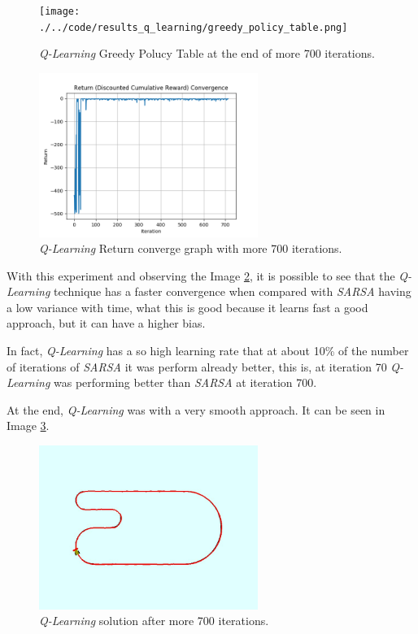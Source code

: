 \documentclass[journal]{IEEEtran}
\begin{document}
\begin{figure}
  \begin{center}
  \texttt{[image: ./../code/results\_q\_learning/greedy\_policy\_table.png]}
  \caption{\textit{Q-Learning} Greedy Polucy Table at the end of more 700 iterations.}
  \label{img:qlearning_greedy}
  \end{center}
\end{figure}

\begin{figure}
  \begin{center}
  \includegraphics[width=2.8in]{./../code/results_q_learning/return_convergence.png}
  \caption{\textit{Q-Learning} Return converge graph with more 700 iterations.}
  \label{img:qlearning_convergence}
  \end{center}
\end{figure}

With this experiment and observing the Image \ref{img:qlearning_convergence}, it is possible to see that the \textit{Q-Learning} technique has a faster convergence when compared with \textit{SARSA} having a low variance with time, what this is good because it learns fast a good approach, but it can have a higher bias.

In fact, \textit{Q-Learning} has a so high learning rate that at about 10\% of the number of iterations of \textit{SARSA} it was perform already better, this is, at iteration 70 \textit{Q-Learning} was performing better than \textit{SARSA} at iteration 700.

At the end, \textit{Q-Learning} was with a very smooth approach. It can be seen in Image \ref{img:qlearning_solution}.

\begin{figure}
  \begin{center}
  \includegraphics[width=2.8in]{./../code/results_q_learning/line_follower_solution.jpeg}
  \caption{\textit{Q-Learning} solution after more 700 iterations.}
  \label{img:qlearning_solution}
  \end{center}
\end{figure}
\end{document}
